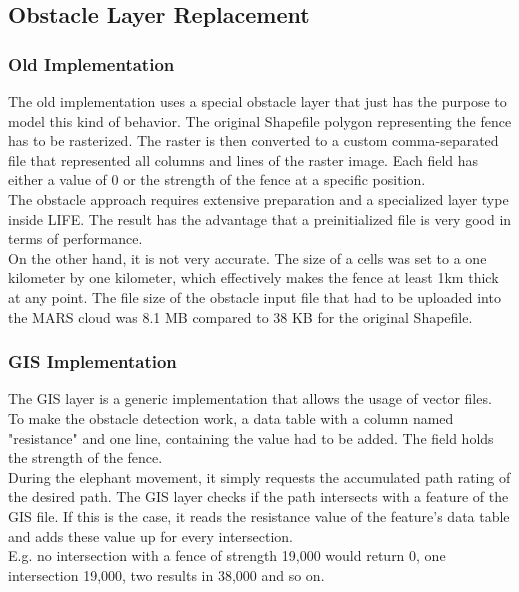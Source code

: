 \subsection{Obstacle Layer Replacement}


\subsubsection{Old Implementation}
The old implementation uses a special obstacle layer that just has the purpose to model this kind of behavior. The original Shapefile polygon representing the fence has to be rasterized. The raster is then converted to a custom comma-separated file that represented all columns and lines of the raster image. Each field has either a value of 0 or the strength of the fence at a specific position.\\
The obstacle approach requires extensive preparation and a specialized layer type inside LIFE. The result has the advantage that a preinitialized file is very good in terms of performance.\\
On the other hand, it is not very accurate. The size of a cells was set to a one kilometer by one kilometer, which effectively makes the fence at least 1km thick at any point. The file size of the obstacle input file that had to be uploaded into the MARS cloud was 8.1 MB compared to 38 KB for the original Shapefile.


\subsubsection{GIS  Implementation}
The GIS layer is a generic implementation that allows the usage of vector files. To make the obstacle detection work, a data table with a column named "resistance" and one line, containing the value had to be added. The field holds the strength of the fence.\\
During the elephant movement, it simply requests the accumulated path rating of the desired path. The GIS layer checks if the path intersects with a feature of the GIS file. If this is the case, it reads the resistance value of the feature's data table and adds these value up for every intersection.\\
E.g. no intersection with a fence of strength 19,000 would return 0, one intersection 19,000, two results in 38,000 and so on.


